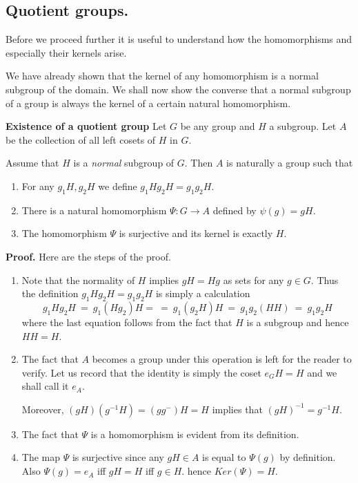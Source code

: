 \documentclass[12pt]{article}
\begin{document}
\subsection{Quotient groups.}
Before we proceed further it is useful to understand how the
homomorphisms and especially their kernels arise.

We have already shown that the kernel of any homomorphism is a normal
subgroup of the domain. We shall now show the converse that a normal
subgroup of a group is always the kernel of a certain natural
homomorphism.

{\bf Existence of a quotient group}
Let $G$ be any group and $H$ a subgroup. Let $A$ be the collection of
all left cosets of $H$ in $G$.

Assume that $H$ is a {\it normal} subgroup of $G$. Then $A$ is naturally
a group such that
\begin{enumerate}
\item For any $g_1H,g_2H$ we define $g_1Hg_2H=g_1g_2H$.
\item There is a natural homomorphism $\Psi:G\rightarrow A$ defined by
$\psi(g)=gH$.
\item The homomorphism $\Psi$ is surjective and its kernel is exactly
$H$.
\end{enumerate}

{\bf Proof.}
Here are the steps of the proof.
\begin{enumerate}
\item Note that the normality of $H$ implies $gH=Hg$ as sets for any
$g\in G$. Thus the definition $g_1Hg_2H=g_1g_2H$ is simply a calculation
$$g_1Hg_2H~=~ g_1(Hg_2)H =~=~ g_1(g_2H)H ~=~ g_1g_2(HH) ~=~ g_1g_2H$$
where the last equation follows from the fact that $H$ is a subgroup and
hence $HH=H$.

\item The fact that $A$ becomes a group under this operation is left for
the reader to verify. Let  us record that the identity is simply the
coset $e_GH=H$ and we shall call it $e_A$.

Moreover, $(gH)(g^{-1}H)=(gg^{-})H=H$ implies that
$(gH)^{-1}=g^{-1}H$.

\item The fact that $\Psi$ is a homomorphism is evident from its
definition.

\item The map $\Psi$ is surjective since any $gH\in A$ is equal to
$\Psi(g)$ by definition. Also $\Psi(g)=e_A$ iff $gH=H$ iff $g\in H$.
hence $Ker(\Psi)=H$.

\end{enumerate}
\end{document}
